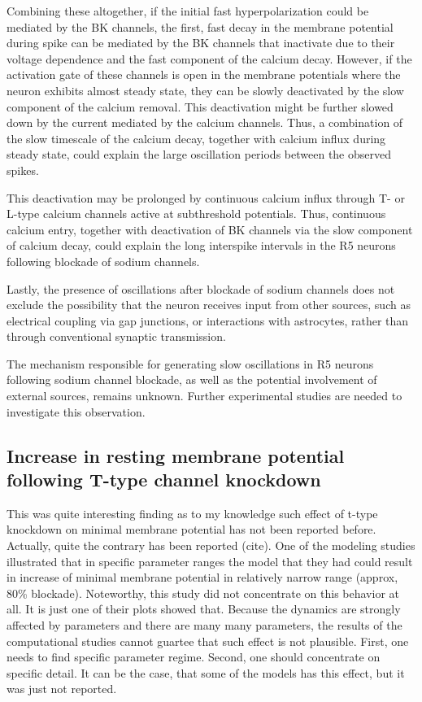 \documentclass[../main.tex]{subfiles}
\begin{document}
Combining these altogether, if the initial fast hyperpolarization could be mediated by the BK channels, the first, fast decay in the membrane potential during spike can be mediated by the BK channels that inactivate due to their voltage dependence and the fast component of the calcium decay. However, if the activation gate of these channels is open in the membrane potentials where the neuron exhibits almost steady state, they can be slowly deactivated by the slow component of the calcium removal. This deactivation might be further slowed down by the current mediated by the calcium channels. Thus, a combination of the slow timescale of the calcium decay, together with calcium influx during steady state, could explain the large oscillation periods between the observed spikes.

This deactivation may be prolonged by continuous calcium influx through T- or L-type calcium channels active at subthreshold potentials. Thus, continuous calcium entry, together with deactivation of BK channels via the slow component of calcium decay, could explain the long interspike intervals in the R5 neurons following blockade of sodium channels.

Lastly, the presence of oscillations after blockade of sodium channels does not exclude the possibility that the neuron receives input from other sources, such as electrical coupling via gap junctions, or interactions with astrocytes, rather than through conventional synaptic transmission.

The mechanism responsible for generating slow oscillations in R5 neurons following sodium channel blockade, as well as the potential involvement of external sources, remains unknown. Further experimental studies are needed to investigate this observation.


\subsection{Increase in resting membrane potential following T-type channel knockdown}

\color{red}

This was quite interesting finding as to my knowledge such effect of t-type knockdown on minimal membrane potential has not been reported before. Actually, quite the contrary has been reported (cite). 
One of the modeling studies illustrated that in specific parameter ranges the model that they had could result in increase of minimal membrane potential in relatively narrow range (approx, 80\% blockade). Noteworthy, this study did not concentrate on this behavior at all. It is just one of their plots showed that. Because the dynamics are strongly affected by parameters and there are many many parameters, the results of the computational studies cannot guartee that such effect is not plausible. First, one needs to find specific parameter regime. Second, one should concentrate on specific detail. It can be the case, that some of the models has this effect, but it was just not reported.
\end{document}

